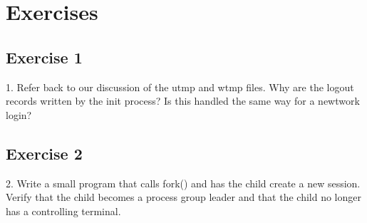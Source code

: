 \documentclass{article}
\begin{document}
\section{Exercises}
\subsection{Exercise 1}
1. Refer back to our discussion of the utmp and wtmp files. Why are the logout 
records written by the init process? \newline 
Is this handled the same way for a newtwork login?
\subsection{Exercise 2}
2. Write a small program that calls fork() and has the child create
a new session. Verify that the child becomes a process group leader and that the 
child no longer has a controlling terminal.
\end{document}
